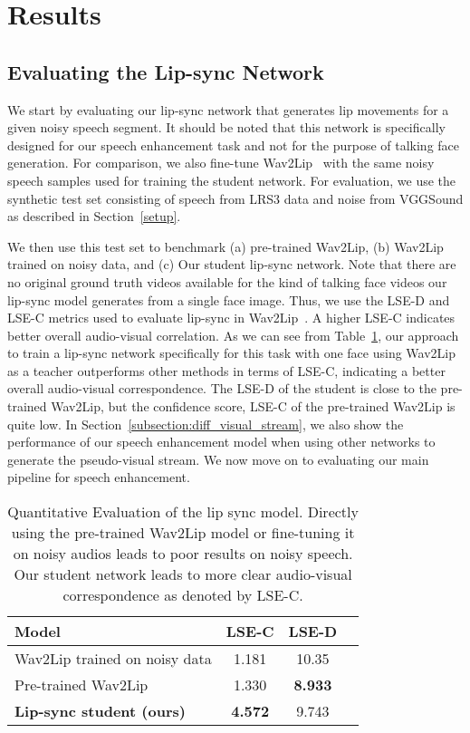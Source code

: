 \documentclass[10pt,twocolumn,letterpaper]{article}
\begin{document}
\section{Results}
\label{section:results}


\subsection{Evaluating the Lip-sync Network}
\label{subsection:lipsync_eval}

We start by evaluating our lip-sync network that generates lip movements for a given noisy speech segment. It should be noted that this network is specifically designed for our speech enhancement task and not for the purpose of talking face generation. For comparison, we also fine-tune Wav2Lip~\cite{wav2lip:2020} with the same noisy speech samples used for training the student network. For evaluation, we use the synthetic test set consisting of speech from LRS3 data and noise from VGGSound as described in Section~\ref{setup}.

We then use this test set to benchmark (a) pre-trained Wav2Lip, (b) Wav2Lip trained on noisy data, and (c) Our student lip-sync network. Note that there are no original ground truth videos available for the kind of talking face videos our lip-sync model generates from a single face image. Thus, we use the LSE-D and LSE-C metrics used to evaluate lip-sync in Wav2Lip~\cite{wav2lip:2020}. A higher LSE-C indicates better overall audio-visual correlation. As we can see from Table~\ref{table:lipsync_metric}, our approach to train a lip-sync network specifically for this task with one face using Wav2Lip as a teacher outperforms other methods in terms of LSE-C, indicating a better overall audio-visual correspondence. The LSE-D of the student is close to the pre-trained Wav2Lip, but the confidence score, LSE-C of the pre-trained Wav2Lip is quite low. In Section~\ref{subsection:diff_visual_stream}, we also show the performance of our speech enhancement model when using other networks to generate the pseudo-visual stream. We now move on to evaluating our main pipeline for speech enhancement. 

\begin{table}[ht]
    \centering
    \caption{Quantitative Evaluation of the lip sync model. Directly using the pre-trained Wav2Lip model or fine-tuning it on noisy audios leads to poor results on noisy speech. Our student network leads to more clear audio-visual correspondence as denoted by LSE-C.}
    \begin{tabular}{lccc}
    \hline
    \textbf{Model} & LSE-C & LSE-D\\
    \hline
    Wav2Lip trained on noisy data & 1.181 &  10.35\\
    Pre-trained Wav2Lip & 1.330 & \textbf{8.933} \\
    \textbf{Lip-sync student (ours)} & \textbf{4.572} & 9.743\\
    
    \hline
    \end{tabular}
    \label{table:lipsync_metric}
\end{table}
\end{document}

